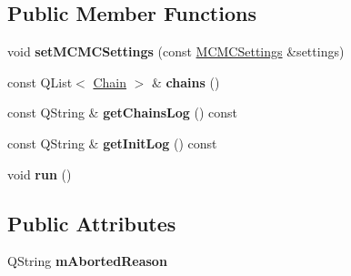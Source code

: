 \subsection*{Public Member Functions}
\begin{DoxyCompactItemize}
\item 
\hypertarget{class_m_c_m_c_loop_a44a2a35a91db7f2e32efecb70bf12d6d}{void {\bfseries set\-M\-C\-M\-C\-Settings} (const \hyperlink{class_m_c_m_c_settings}{M\-C\-M\-C\-Settings} \&settings)}\label{class_m_c_m_c_loop_a44a2a35a91db7f2e32efecb70bf12d6d}

\item 
\hypertarget{class_m_c_m_c_loop_a1036b058871c0261942cad03fe3d7fca}{const Q\-List$<$ \hyperlink{struct_chain}{Chain} $>$ \& {\bfseries chains} ()}\label{class_m_c_m_c_loop_a1036b058871c0261942cad03fe3d7fca}

\item 
\hypertarget{class_m_c_m_c_loop_a5a5f74164103703ef907567fbbc7ac31}{const Q\-String \& {\bfseries get\-Chains\-Log} () const }\label{class_m_c_m_c_loop_a5a5f74164103703ef907567fbbc7ac31}

\item 
\hypertarget{class_m_c_m_c_loop_a2703806d0260564b1c243439eaf8e421}{const Q\-String \& {\bfseries get\-Init\-Log} () const }\label{class_m_c_m_c_loop_a2703806d0260564b1c243439eaf8e421}

\item 
\hypertarget{class_m_c_m_c_loop_ad9b7ba7afd62e0ead77c50dfbeb73da5}{void {\bfseries run} ()}\label{class_m_c_m_c_loop_ad9b7ba7afd62e0ead77c50dfbeb73da5}

\end{DoxyCompactItemize}
\subsection*{Public Attributes}
\begin{DoxyCompactItemize}
\item 
\hypertarget{class_m_c_m_c_loop_af906cc8bf954527042bbe239c833b66c}{Q\-String {\bfseries m\-Aborted\-Reason}}\label{class_m_c_m_c_loop_af906cc8bf954527042bbe239c833b66c}

\end{DoxyCompactItemize}
